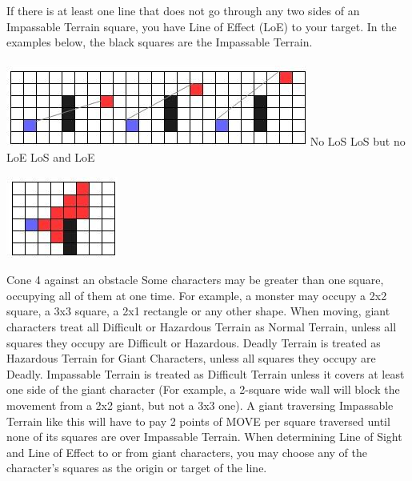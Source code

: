 If there is at least one line that does not go through any two sides of an Impassable Terrain square, you have Line of Effect (LoE) to your target. 
In the examples below, the black squares are the Impassable Terrain.\\\\
%		
\includegraphics[width=\columnwidth]{./art/images/ffrpg-los.png}
\hspace*{1cm} No LoS \hspace*{0.8cm} LoS but no LoE \hspace*{0.5cm} LoS and LoE\\
\begin{center}
	\includegraphics[width=0.4\columnwidth]{./art/images/ffrpg-obstacle.png}
\end{center}
\hfill Cone 4 against an obstacle \hfill
\ofrow
%
%
 Some characters may be greater than one square, occupying all of them at one time. 
For example, a monster may occupy a 2x2 square, a 3x3 square, a 2x1 rectangle or any other shape. 
When moving, giant characters treat all Difficult or Hazardous Terrain as Normal Terrain, unless all squares they occupy are Difficult or Hazardous. Deadly Terrain is treated as Hazardous Terrain for Giant Characters, unless all squares they occupy are Deadly.
Impassable Terrain is treated as Difficult Terrain unless it covers at least one side of the giant character (For example, a 2-square wide wall will block the movement from a 2x2 giant, but not a 3x3 one). A giant traversing Impassable Terrain like this will have to pay 2 points of MOVE per square traversed until none of its squares are over Impassable Terrain.
When determining Line of Sight and Line of Effect to or from giant characters, you may choose any of the character’s squares as the origin or target of the line.
